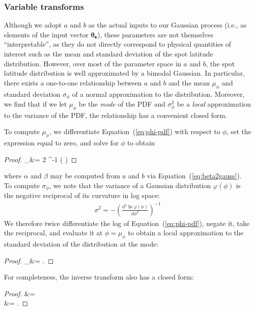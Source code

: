 \documentclass[modern]{aastex62}
\begin{document}
\subsubsection{Variable transforms}
\label{sec:lat-transform}


Although we adopt $a$ and $b$ as the actual inputs to our Gaussian process
(i.e., as elements of the input vector $\pmb{\theta}_\bullet$), these
parameters are not themselves ``interpretable'', as they do not directly
correspond to physical
quantities of interest such as the mean and standard deviation of the spot
latitude distribution. However, over most of the parameter space in $a$ and $b$,
the spot latitude distribution is well approximated
by a bimodal Gaussian. In particular, there exists
a one-to-one relationship between $a$ and $b$ and the mean $\mu_\phi$
and standard deviation $\sigma_\phi$ of a normal approximation to the
distribution. Moreover, we find that
if we let $\mu_\phi$ be the \emph{mode} of the PDF and
$\sigma_\phi^2$ be a \emph{local} approximation to the variance of the PDF,
the relationship has a convenient closed form.

To compute $\mu_\phi$, we differentiate Equation~(\ref{eq:phi-pdf}) with respect
to $\phi$, set the expression equal to zero, and solve
for $\phi$ to obtain
%
\begin{proof}{}
    \mu_\phi &= 2 \tan^{-1}
    \left(
    \right)
\end{proof}
%
where $\alpha$ and $\beta$ may be computed from $a$ and $b$ via
Equation~(\ref{eq:beta2gauss}).
%
To compute $\sigma_\phi$, we note that the variance of a Gaussian distribution
$\varphi(\phi)$
is the negative reciprocal of its curvature in log space:
%
\begin{align}
    \sigma^2 = -\left(\frac{\mathrm{d}^2 \ln \varphi(\phi)}{\mathrm{d}\phi^2}\right)^{-1}
\end{align}
%
We therefore twice differentiate the log of Equation~(\ref{eq:phi-pdf}), negate it,
take the reciprocal, and evaluate it at $\phi = \mu_\phi$ to obtain a local
approximation to the standard deviation of the distribution at the mode:
%
\begin{proof}{}
    \sigma_\phi &= 
    \quad.
\end{proof}
%
For completeness, the inverse transform also has a closed form:
%
\begin{proof}{}
    \alpha &=  \\
    \beta &= 
    \quad.
\end{proof}
\end{document}
